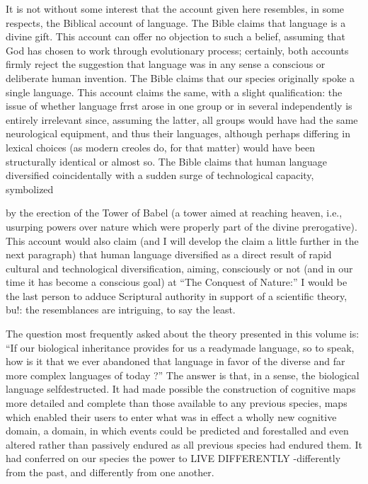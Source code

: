 It is not without some interest that the account given here resembles, in some respects, the Biblical account of language. The Bible claims that language is a divine gift. This account can offer no objection to such a belief, assuming that God has chosen to work through evolutionary process; certainly, both accounts firmly reject the suggestion that language was in any sense a conscious or deliberate human invention. The Bible claims that our species originally spoke a single language. This account claims the same, with a slight qualifi\-cation: the issue of whether language frrst arose in one group or in several independently is entirely irrelevant since, assuming the latter, all groups would have had the same neurological equipment, and thus their languages, although perhaps differing in lexical choices (as modern creoles do, for that matter) would have been structurally identical or almost so. The Bible claims that human language diversified coinci\-dentally with a sudden surge of technological capacity, symbolized


by the erection of the Tower of Babel (a tower aimed at reaching heaven, i.e., usurping powers over nature which were properly part of the divine prerogative). This account would also claim (and I will develop the claim a little further in the next paragraph) that human language diversified as a direct result of rapid cultural and technological diversification, aiming, consciously or not (and in our time it has become a conscious goal) at ``The Conquest of Nature:'' I would be the last person to adduce Scriptural authority in support of a scientific theory, bu!: the resemblances are intriguing, to say the least.

The question most frequently asked about the theory presented in this volume is: ``If our biological inheritance provides for us a ready\-made language, so to speak, how is it that we ever abandoned that language in favor of the diverse and far more complex languages of today ?'' The answer is that, in a sense, the biological language self\-destructed. It had made possible the construction of cognitive maps more detailed and complete than those available to any previous species, maps which enabled their users to enter what was in effect a wholly new cognitive domain, a domain, in which events could be predicted and forestalled and even altered rather than passively endured as all previous species had endured them. It had conferred on our species the power to LIVE DIFFERENTLY {}-differently from the past, and differently from one another.

